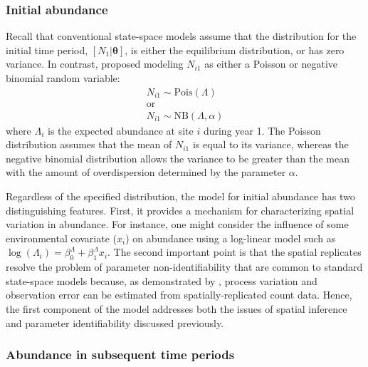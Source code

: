 \documentclass[12pt]{article}
\begin{document}
\subsubsection{Initial abundance}

Recall that conventional state-space models assume that the
distribution for the initial time period,
$[N_1 | \bm{\theta}]$, is either the equilibrium
distribution, or has zero variance.
In contrast, \citet{dail_madsen:2011} proposed modeling $N_{i1}$
as either a Poisson or negative binomial random variable:
\begin{gather}
N_{i1} \sim \mathrm{Pois}(\Lambda) \nonumber \\
\text{or} \nonumber \\
N_{i1} \sim \mathrm{NB}(\Lambda, \alpha)
\label{eq:N1}
\end{gather}
where $\Lambda_i$ is the expected abundance at site $i$ during
year 1.
The Poisson distribution assumes that the mean of $N_{i1}$ is
equal to its variance, whereas the negative binomial distribution allows the
variance to be greater than the mean with the amount of
overdispersion determined by the parameter $\alpha$.

Regardless of the specified distribution, the model for initial
abundance has two distinguishing features. First, it provides a
mechanism for characterizing spatial variation in abundance. For
instance, one might consider the influence of some environmental
covariate ($x_i$) on abundance using a log-linear
model such as $\log(\Lambda_i) = \beta^{\Lambda}_0 +
\beta^{\Lambda}_1
x_{i}$. The second important point is that the spatial
replicates resolve the
problem of parameter non-identifiability that are common to
standard state-space models because, as demonstrated by
\citet{royle:2004biom},
process variation and observation error can be estimated from
spatially-replicated count data. Hence, the first component of
the model addresses both the issues of spatial inference and
parameter identifiability discussed previously.

\subsubsection{Abundance in subsequent time periods}
\end{document}
